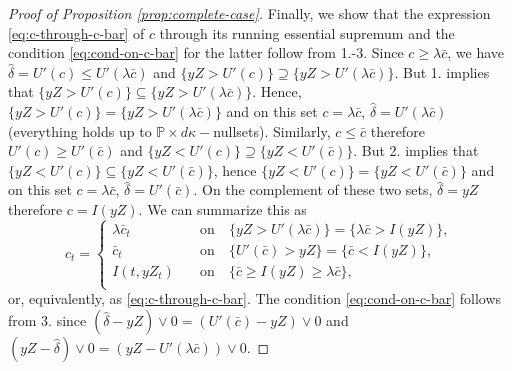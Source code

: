 \documentclass[11pt, oneside]{article}   	%
\theoremstyle{plain}
\theoremstyle{definition}
\theoremstyle{remark}
\begin{document}
\begin{proof}[Proof of Proposition \ref{prop:complete-case}]
Finally, we show that the expression \eqref{eq:c-through-c-bar} of $c$ through its running essential supremum and the condition \eqref{eq:cond-on-c-bar} for the latter follow from 1.-3. Since $c\geq\lambda\bar{c}$, we have $\hat\delta=U'(c)\leq U'(\lambda\bar{c})$ and $\{yZ> U'(c)\}\supseteq\{yZ>U'(\lambda\bar{c})\}$. But 1. implies that $\{yZ> U'(c)\}\subseteq\{yZ>U'(\lambda\bar{c})\}$. Hence, $\{yZ> U'(c)\}=\{yZ>U'(\lambda\bar{c})\}$ and on this set $c=\lambda\bar{c}$, $\hat\delta=U'(\lambda\bar{c})$ (everything holds up to $\mathbb{P}\times d\kappa-$nullsets). Similarly, $c\leq\bar{c}$ therefore $U'(c)\geq U'(\bar{c})$ and $\{yZ< U'(c)\}\supseteq\{yZ<U'(\bar{c})\}$. But 2. implies that $\{yZ< U'(c)\}\subseteq\{yZ<U'(\bar{c})\}$, hence $\{yZ< U'(c)\}=\{yZ<U'(\bar{c})\}$ and on this set $c=\lambda\bar{c}$, $\hat\delta=U'(\bar{c})$. On the complement of these two sets, $\hat\delta=yZ$ therefore $c=I(yZ)$. We can summarize this as
\begin{equation*}
c_t=\left\{\begin{aligned}
\lambda\bar{c}_t&\quad\text{on}\quad\{yZ>U'(\lambda\bar{c})\}=\{\lambda\bar{c}>I(yZ)\}, \\
\bar{c}_t&\quad\text{on}\quad\{U'(\bar{c})>yZ\}=\{\bar{c}<I(yZ)\},\\
I(t,yZ_t)&\quad\text{on}\quad \{\bar{c}\geq I(yZ)\geq \lambda\bar{c}\},\\
\end{aligned}\right.
\end{equation*}
or, equivalently, as \eqref{eq:c-through-c-bar}. The condition \eqref{eq:cond-on-c-bar} follows from 3. since $(\hat\delta-yZ)\vee0=(U'(\bar{c})-yZ)\vee 0$ and $(yZ-\hat\delta)\vee 0=(yZ-U'(\lambda\bar{c}))\vee 0$.
\end{proof}
\end{document}
